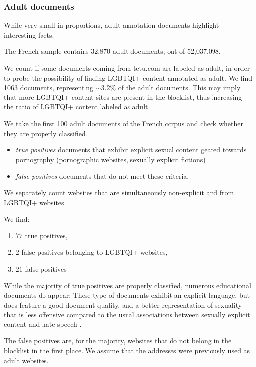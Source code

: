 \subsubsection{Adult documents}

While very small in proportions, adult annotation documents highlight interesting facts.

The French sample contains 32,870 adult documents, out of 52,037,098.

We count if some documents coming from tetu.com are labeled as adult, in order to probe the possibility of finding LGBTQI+ content annotated as adult. We find 1063 documents, representing $\sim 3.2\%$ of the adult documents. This may imply that more LGBTQI+ content sites are present in the blocklist, thus increasing the ratio of LGBTQI+ content labeled as adult.

We take the first 100 adult documents of the French corpus and check whether they are properly classified.
\begin{itemize}
    \item \emph{true positives} documents that exhibit explicit sexual content geared towards pornography (pornographic websites, sexually explicit fictions)
    \item \emph{false positives} documents that do not meet these criteria,
\end{itemize}

We separately count websites that are simultaneously non-explicit and from LGBTQI+ websites.

We find:
\begin{enumerate}
    \item $77$ true positives,
    \item $2$ false positives belonging to LGBTQI+ websites,
    \item $21$ false positives
\end{enumerate}

While the majority of true positives are properly classified, numerous educational documents do appear: These type of documents exhibit an explicit language, but does feature a good document quality, and a better representation of sexuality that is less offensive compared to the usual associations between sexually explicit content and hate speech \cite{luccioni-viviano-2021-whats}.

The false positives are, for the majority, websites that do not belong in the blocklist in the first place. We assume that the addresses were previously used as adult websites.

